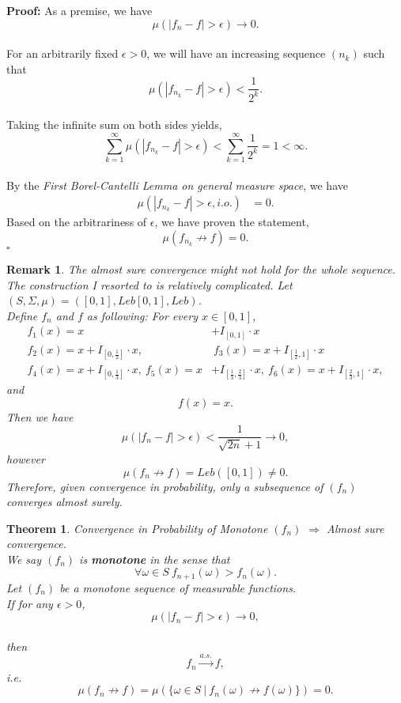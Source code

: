 \documentclass[UTF8, 12pt]{article}
\newenvironment{proof}{\noindent\ignorespaces\textbf{Proof:}}{\hfill $\square$\par\noindent}
\newtheorem{theorem}{Theorem}
\newtheorem*{remark*}{Remark}
\begin{document}
    \text{}

    \begin{proof}
        As a premise, we have $$ \mu(|f_n-f| > \epsilon) \to 0. $$ \\
        For an arbitrarily fixed $\epsilon > 0$, we will have an increasing sequence $(n_k)$ such that
        $$ \mu(|f_{n_k} - f| > \epsilon) < \frac{1}{2^k}.$$ \\
        Taking the infinite sum on both sides yields, $$ \sum_{k=1}^{\infty} \mu(|f_{n_k} - f| > \epsilon) < \sum_{k=1}^{\infty} \frac{1}{2^k} = 1 < \infty .$$ \\
        By the \textit{First Borel-Cantelli Lemma on general measure space}, we have
        \begin{align*}
            \mu(|f_{n_k} - f| > \epsilon, i.o.) &= 0.
        \end{align*}
        Based on the arbitrariness of $\epsilon$, we have proven the statement, $$ \mu(f_{n_k} \not\rightarrow f) = 0 .$$
    \end{proof}

    \begin{remark*}
        The almost sure convergence might not hold for the whole sequence. \\
        The construction I resorted to is relatively complicated. Let $(S,\Sigma, \mu) = ([0,1], Leb[0,1], Leb)$. \\
        Define $f_n$ and $f$ as following: For every $x \in [0,1]$, 
        \begin{align*}
            f_1(x) = x &+ I_{[0,1]} \cdot x \\
            f_2(x) = x + I_{[0,\frac{1}{2}]} \cdot x ,&~ f_3(x) = x + I_{[\frac{1}{2}, 1]} \cdot x \\
            f_4(x) = x + I_{[0,\frac{1}{3}]} \cdot x, ~ f_5(x) = x &+ I_{[\frac{1}{3}, \frac{2}{3}]} \cdot x, ~ f_6(x) = x + I_{[\frac{2}{3}, 1]} \cdot x,
        \end{align*}
        and $$ f(x) = x. $$
        Then we have $$ \mu(|f_n-f| > \epsilon) < \frac{1}{\sqrt{2n} + 1} \to 0, $$
        however $$ \mu(f_n \not\rightarrow f) = Leb([0,1]) \neq 0. $$
        Therefore, given convergence in probability, only a subsequence of $(f_n)$ converges almost surely.
    \end{remark*}
    
    \text{}

    \begin{theorem}
        Convergence in Probability of Monotone $(f_n)$ $\Longrightarrow$ Almost sure convergence. \\
        We say $(f_n)$ is \textbf{monotone} in the sense that $$ \forall \omega \in S\ f_{n+1}(\omega) > f_n(\omega) .$$
        Let $(f_n)$ be a monotone sequence of measurable functions. \\ If for any $\epsilon > 0$, $$ \mu(|f_n-f| > \epsilon) \to 0 ,$$ \\
        then $$ f_{n} \overset{a.s.}{\longrightarrow} f ,$$ 
        i.e. $$ \mu(f_{n} \not\rightarrow f) = \mu(\{\omega\in S \ |\ f_{n}(\omega) \not\rightarrow f(\omega)\}) = 0 .$$ 
    \end{theorem}
\end{document}
